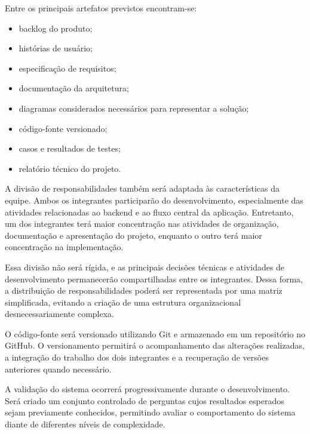 Entre os principais artefatos previstos encontram-se:

\begin{itemize}

    \item backlog do produto;

    \item histórias de usuário;

    \item especificação de requisitos;

    \item documentação da arquitetura;

    \item diagramas considerados necessários para representar a solução;

    \item código-fonte versionado;

    \item casos e resultados de testes;

    \item relatório técnico do projeto.

\end{itemize}

A divisão de responsabilidades também será adaptada às características da equipe. Ambos os integrantes participarão do desenvolvimento, especialmente das atividades relacionadas ao backend e ao fluxo central da aplicação. Entretanto, um dos integrantes terá maior concentração nas atividades de organização, documentação e apresentação do projeto, enquanto o outro terá maior concentração na implementação.

Essa divisão não será rígida, e as principais decisões técnicas e atividades de desenvolvimento permanecerão compartilhadas entre os integrantes. Dessa forma, a distribuição de responsabilidades poderá ser representada por uma matriz simplificada, evitando a criação de uma estrutura organizacional desnecessariamente complexa.

O código-fonte será versionado utilizando Git e armazenado em um repositório no GitHub. O versionamento permitirá o acompanhamento das alterações realizadas, a integração do trabalho dos dois integrantes e a recuperação de versões anteriores quando necessário.

A validação do sistema ocorrerá progressivamente durante o desenvolvimento. Será criado um conjunto controlado de perguntas cujos resultados esperados sejam previamente conhecidos, permitindo avaliar o comportamento do sistema diante de diferentes níveis de complexidade.

